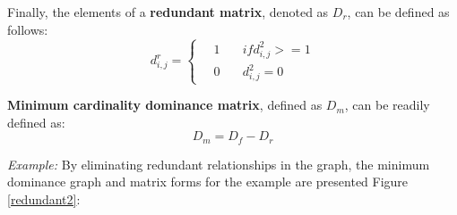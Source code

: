 \documentclass[12pt,english]{report}
\begin{document}
Finally, the elements of a \textbf{redundant matrix}, denoted as $ D_r$, can be
defined as follows:
\begin{equation}
d^{r}_{i,j} =
  \begin{cases}
  \quad  1   & \quad if d^{2}_{i,j} >= 1 \\
  \quad  0  & \quad d^{2}_{i,j} = 0 
  \end{cases}	
\end{equation}

\textbf{Minimum cardinality dominance matrix}, defined as $D_m$, can be readily
defined as:
$$D_m = D_f - D_r $$
 
\textit{Example:} By eliminating redundant relationships in the graph, the
minimum dominance graph and matrix forms for the example are presented Figure
\ref{redundant2}:





\begin{figure}
	\begin{floatrow}
	\capbtabbox{%
	\begin{tabular}{l|llllll}
		& 1 & 2 & 3 & 4 & 5 & 6 \\ \hline
		1 & 0 & 0 & 0 & 0 & 0 & 0 \\
		2 & 1 & 0 & 0 & 1 & 1 & 0 \\
		3 & 0 & 1 & 0 & 0 & 0 & 0 \\
		4 & 0 & 0 & 0 & 0 & 0 & 0 \\
		5 & 0 & 0 & 0 & 0 & 0 & 0 \\
		6 & 0 & 1 & 0 & 0 & 0 & 0
	\end{tabular}
		\label{domin_matrix3}%
	}{%
	\caption{Minimum Dominance in Matrix}%
	\label{redundant2}
}
\end{floatrow}
\end{figure}
\end{document}
